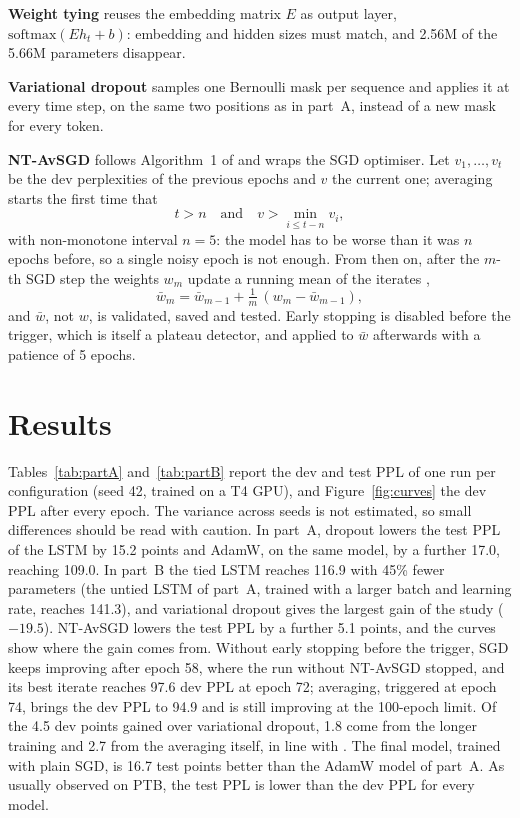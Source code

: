 \documentclass[a4paper]{article}
\begin{document}
\textbf{Weight tying} \cite{press2017tying,inan2017tying} reuses the embedding matrix $E$ as output layer,
$\mathrm{softmax}(E h_t + b)$: embedding and hidden sizes must match, and 2.56M of the 5.66M parameters disappear.

\textbf{Variational dropout} \cite{gal2016dropout} samples one Bernoulli mask per sequence and applies it at every
time step, on the same two positions as in part~A, instead of a new mask for every token.

\textbf{NT-AvSGD} follows Algorithm~1 of \cite{merity2018awdlstm} and wraps the SGD optimiser. Let
$v_1,\dots,v_t$ be the dev perplexities of the previous epochs and $v$ the current one; averaging starts the first
time that
\begin{equation}
  t > n \quad \text{and} \quad v > \min_{i \le t-n} v_i ,
\end{equation}
with non-monotone interval $n=5$: the model has to be worse than it was $n$ epochs before, so a single noisy epoch
is not enough. From then on, after the $m$-th SGD step the weights $w_m$ update a running mean of the iterates
\cite{polyak1992averaging},
\begin{equation}
  \bar w_m = \bar w_{m-1} + \tfrac{1}{m}\,(w_m - \bar w_{m-1}),
\end{equation}
and $\bar w$, not $w$, is validated, saved and tested. Early stopping is disabled before the trigger, which is
itself a plateau detector, and applied to $\bar w$ afterwards with a patience of 5 epochs.

\section{Results}

Tables~\ref{tab:partA} and~\ref{tab:partB} report the dev and test PPL of one run per configuration (seed 42,
trained on a T4 GPU), and Figure~\ref{fig:curves} the dev PPL after every epoch. The variance across seeds is not
estimated, so small differences should be read with caution. In part~A, dropout lowers the test
PPL of the LSTM by 15.2 points and AdamW, on the same model, by a further 17.0, reaching 109.0. In part~B the tied
LSTM reaches 116.9 with 45\% fewer parameters (the untied LSTM of part~A, trained with a larger batch and learning
rate, reaches 141.3), and variational dropout gives the largest gain of the study ($-19.5$). NT-AvSGD lowers the
test PPL by a further 5.1 points, and the curves show where the gain comes from. Without early stopping before the
trigger, SGD keeps improving after epoch 58, where the run without NT-AvSGD stopped, and its best iterate reaches
97.6 dev PPL at epoch 72; averaging, triggered at epoch 74, brings the dev PPL to 94.9 and is still improving at
the 100-epoch limit. Of the 4.5 dev points gained over variational dropout, 1.8 come from the longer training and
2.7 from the averaging itself, in line with \cite{merity2018awdlstm}. The final model, trained with plain SGD, is
16.7 test points better than the AdamW model of part~A. As usually observed on PTB, the test PPL is lower than the
dev PPL for every model.
\end{document}
